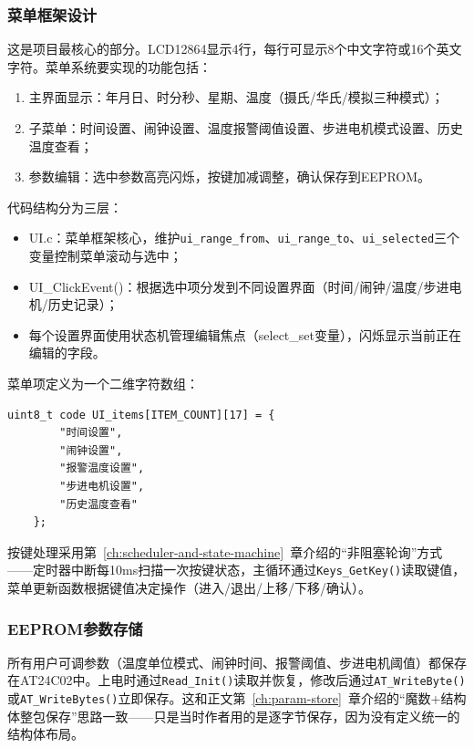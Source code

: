 \subsubsection{菜单框架设计}

这是项目最核心的部分。LCD12864显示4行，每行可显示8个中文字符或16个英文字符。菜单系统要实现的功能包括：

\begin{enumerate}
	\item 主界面显示：年月日、时分秒、星期、温度（摄氏/华氏/模拟三种模式）；
	\item 子菜单：时间设置、闹钟设置、温度报警阈值设置、步进电机模式设置、历史温度查看；
	\item 参数编辑：选中参数高亮闪烁，按键加减调整，确认保存到EEPROM。
\end{enumerate}

代码结构分为三层：

\begin{itemize}
	\item UI.c：菜单框架核心，维护\texttt{ui\_range\_from}、\texttt{ui\_range\_to}、\texttt{ui\_selected}三个变量控制菜单滚动与选中；
	\item UI\_ClickEvent()：根据选中项分发到不同设置界面（时间/闹钟/温度/步进电机/历史记录）；
	\item 每个设置界面使用状态机管理编辑焦点（select\_set变量），闪烁显示当前正在编辑的字段。
\end{itemize}

菜单项定义为一个二维字符数组：

\begin{lstlisting}[style=c]
	uint8_t code UI_items[ITEM_COUNT][17] = {
		"时间设置",
		"闹钟设置",
		"报警温度设置",
		"步进电机设置",
		"历史温度查看"
	};
\end{lstlisting}

按键处理采用第~\ref{ch:scheduler-and-state-machine}~章介绍的“非阻塞轮询”方式——定时器中断每10ms扫描一次按键状态，主循环通过\texttt{Keys\_GetKey()}读取键值，菜单更新函数根据键值决定操作（进入/退出/上移/下移/确认）。

\subsubsection{EEPROM参数存储}

所有用户可调参数（温度单位模式、闹钟时间、报警阈值、步进电机阈值）都保存在AT24C02中。上电时通过\texttt{Read\_Init()}读取并恢复，修改后通过\texttt{AT\_WriteByte()}或\texttt{AT\_WriteBytes()}立即保存。这和正文第~\ref{ch:param-store}~章介绍的“魔数+结构体整包保存”思路一致——只是当时作者用的是逐字节保存，因为没有定义统一的结构体布局。

